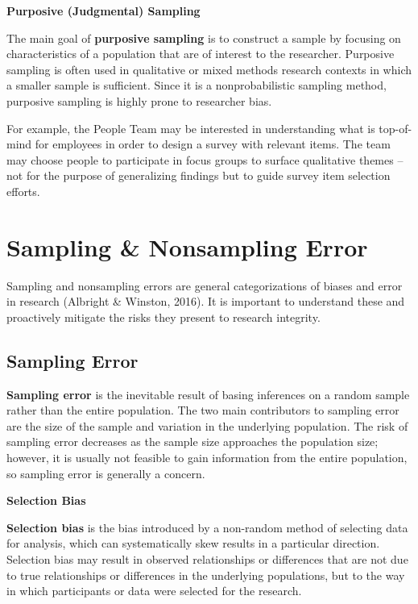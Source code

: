 \documentclass[
]{book}
\begin{document}
\textbf{Purposive (Judgmental) Sampling}

The main goal of \textbf{purposive sampling} is to construct a sample by focusing on characteristics of a population that are of interest to the researcher. Purposive sampling is often used in qualitative or mixed methods research contexts in which a smaller sample is sufficient. Since it is a nonprobabilistic sampling method, purposive sampling is highly prone to researcher bias.

For example, the People Team may be interested in understanding what is top-of-mind for employees in order to design a survey with relevant items. The team may choose people to participate in focus groups to surface qualitative themes -- not for the purpose of generalizing findings but to guide survey item selection efforts.

\hypertarget{sampling-nonsampling-error}{%
\section{Sampling \& Nonsampling Error}\label{sampling-nonsampling-error}}

Sampling and nonsampling errors are general categorizations of biases and error in research (Albright \& Winston, 2016). It is important to understand these and proactively mitigate the risks they present to research integrity.

\hypertarget{sampling-error}{%
\subsection{Sampling Error}\label{sampling-error}}

\textbf{Sampling error} is the inevitable result of basing inferences on a random sample rather than the entire population. The two main contributors to sampling error are the size of the sample and variation in the underlying population. The risk of sampling error decreases as the sample size approaches the population size; however, it is usually not feasible to gain information from the entire population, so sampling error is generally a concern.

\textbf{Selection Bias}

\textbf{Selection bias} is the bias introduced by a non-random method of selecting data for analysis, which can systematically skew results in a particular direction. Selection bias may result in observed relationships or differences that are not due to true relationships or differences in the underlying populations, but to the way in which participants or data were selected for the research.
\end{document}
